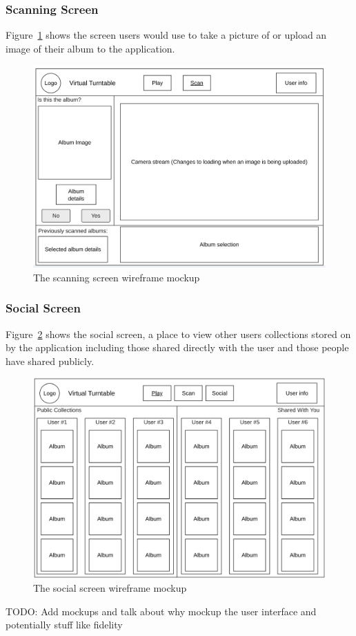 \subsubsection{Scanning Screen}
Figure~\ref{fig:scan_screen_mockup} shows the screen users would use to take a picture of or upload an image of their album to the application.
\begin{figure} [H]
    \centering
    \includegraphics[width=0.6\linewidth]{figures/scan_screen_mockup.png}
    \caption{The scanning screen wireframe mockup}
    \label{fig:scan_screen_mockup}
\end{figure}


\subsubsection{Social Screen}
Figure~\ref{fig:social_screen_mockup} shows the social screen, a place to view other users collections stored on by the application including those shared directly with the user and those people have shared publicly.
\begin{figure} [H]
    \centering
    \includegraphics[width=0.6\linewidth]{figures/social_screen_mockup.png}
    \caption{The social screen wireframe mockup}
    \label{fig:social_screen_mockup}
\end{figure}



TODO: Add mockups and talk about why mockup the user interface and potentially stuff like fidelity

